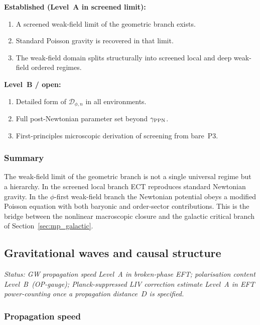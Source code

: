 \textbf{Established (Level~A in screened limit):}
\begin{enumerate}[label=(\roman*)]
  \item A screened weak-field limit of the geometric branch exists.
  \item Standard Poisson gravity is recovered in that limit.
  \item The weak-field domain splits structurally into screened local
    and deep weak-field ordered regimes.
\end{enumerate}

\textbf{Level~B / open:}
\begin{enumerate}[label=(\roman*)]
  \item Detailed form of $\mathcal{D}_{\phi,n}$ in all environments.
  \item Full post-Newtonian parameter set beyond $\gamma_{\rm PPN}$.
  \item First-principles microscopic derivation of screening
    from bare~P3.
\end{enumerate}

\subsubsection*{Summary}

The weak-field limit of the geometric branch is not a single universal
regime but a hierarchy.
In the screened local branch ECT reproduces standard Newtonian gravity.
In the $\phi$-first weak-field branch the Newtonian potential obeys a
modified Poisson equation with both baryonic and order-sector
contributions.
This is the bridge between the nonlinear macroscopic closure and the
galactic critical branch of Section~\ref{sec:mp_galactic}.



\subsection{Gravitational waves and causal structure}
\label{sec:mp_gw}

\textit{Status: GW propagation speed Level~A in broken-phase EFT;
polarisation content Level~B~(OP-gauge);
Planck-suppressed LIV correction estimate Level~A in EFT
power-counting once a propagation distance~$D$ is specified.}

\subsubsection*{Propagation speed}

